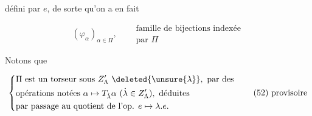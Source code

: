 défini par $e$, de sorte qu'on a en fait

\[
(\varphi_\alpha)_{\alpha\in\Pi},\quad
\begin{aligned}&\text{famille de bijections indexée}\\ &\text{par }\Pi\end{aligned} \tag*{(51)}
\]

Notons que 


\[
\left\{\begin{aligned}
&\Pi\ \text{est un torseur sous }Z'_\Lambda\ \deleted{\unsure{\lambda}},\ \text{par des}\\
&\text{opérations notées }\alpha\mapsto T_{\dot\lambda}\alpha\ (\dot\lambda\in Z'_\Lambda),\ \text{déduites}\\
&\text{par passage au quotient de l'op. }e\mapsto\lambda.e.
\end{aligned}\right. \tag*{\text{(52) provisoire}}
\]

